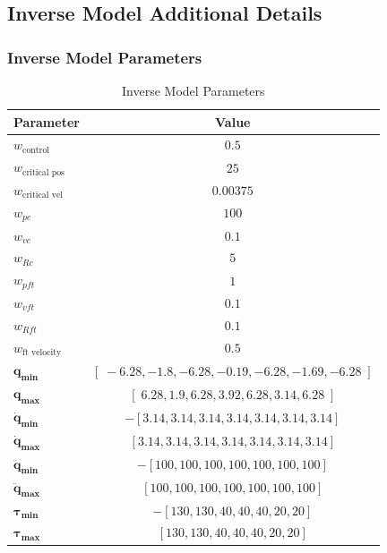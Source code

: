 \documentclass[conference]{IEEEtran}
\begin{document}
\subsection{Inverse Model Additional Details}
\subsubsection{Inverse Model Parameters}
\label{sec:optimization_params}
\begin{table}[t]
\centering
\caption{Inverse Model Parameters}
\label{tab:invmodelparams}
\begin{tabular}{l c}
\toprule
\textbf{Parameter} & \textbf{Value} \\
\midrule
$w_{\text{control}}$ & $\;0.5\;$ \\
$w_{\text{critical pos}}$ & $\;25\;$ \\
$w_{\text{critical vel}}$ & $\;0.00375\;$ \\
$w_{pc}$ & $\;100\;$ \\
$w_{vc}$ & $\;0.1\;$ \\
$w_{Rc}$ & $\;5\;$ \\
$w_{pft}$ & $\;1\;$ \\
$w_{vft}$ & $\;0.1\;$ \\
$w_{Rft}$ & $\;0.1\;$ \\
$w_{\text{ft velocity}}$ & $\;0.5\;$ \\
$\mathbf{q_{\min}}$ & $[\;-6.28, -1.8, -6.28, -0.19, -6.28, -1.69, -6.28\;]$ \\
$\mathbf{q_{\max}}$ & $[\;6.28, 1.9, 6.28, 3.92, 6.28, 3.14, 6.28\;]$ \\
$\mathbf{\dot q_{\min}}$ & $-[3.14, 3.14, 3.14, 3.14, 3.14, 3.14, 3.14]$ \\
$\mathbf{\dot q_{\max}}$ & $[3.14, 3.14, 3.14, 3.14, 3.14, 3.14, 3.14]$ \\
$\mathbf{\ddot q_{\min}}$ & $-[100, 100, 100, 100, 100, 100, 100]$ \\
$\mathbf{\ddot q_{\max}}$ & $[100, 100, 100, 100, 100, 100, 100]$ \\
$\mathbf{\tau_{\min}}$ & $-[130, 130, 40, 40, 40, 20, 20]$ \\
$\mathbf{\tau_{\max}}$ & $[130, 130, 40, 40, 40, 20, 20]$ \\
\bottomrule
\end{tabular}
\end{table}
\end{document}
